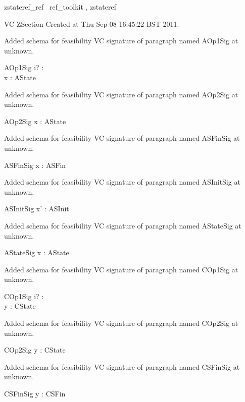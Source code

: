 \documentclass{article}
\begin{document}

\begin{zsection}	 \SECTION zstateref\_ref \parents~ref\_toolkit , zstateref
\end{zsection}

VC ZSection Created at Thu Sep 08 16:45:22 BST 2011.


Added schema for feasibility VC signature of paragraph named AOp1Sig at unknown.
\begin{schema}{AOp1Sig}
i? : \nat \\
 x : \power \nat 
\where
 AState
\end{schema}


Added schema for feasibility VC signature of paragraph named AOp2Sig at unknown.
\begin{schema}{AOp2Sig}
x : \power \nat 
\where
 AState
\end{schema}


Added schema for feasibility VC signature of paragraph named ASFinSig at unknown.
\begin{schema}{ASFinSig}
x : \power \nat 
\where
 ASFin
\end{schema}


Added schema for feasibility VC signature of paragraph named ASInitSig at unknown.
\begin{schema}{ASInitSig}
x' : \power \nat 
\where
 ASInit
\end{schema}


Added schema for feasibility VC signature of paragraph named AStateSig at unknown.
\begin{schema}{AStateSig}
x : \power \nat 
\where
 AState
\end{schema}


Added schema for feasibility VC signature of paragraph named COp1Sig at unknown.
\begin{schema}{COp1Sig}
i? : \nat \\
 y : \seq \nat 
\where
 CState
\end{schema}


Added schema for feasibility VC signature of paragraph named COp2Sig at unknown.
\begin{schema}{COp2Sig}
y : \seq \nat 
\where
 CState
\end{schema}


Added schema for feasibility VC signature of paragraph named CSFinSig at unknown.
\begin{schema}{CSFinSig}
y : \seq \nat 
\where
 CSFin
\end{schema}
\end{document}
